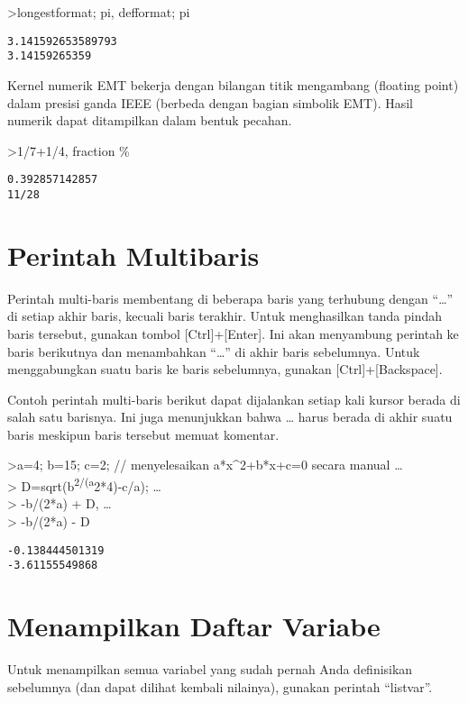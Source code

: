 \documentclass[
]{book}
\begin{document}
\textgreater longestformat; pi, defformat; pi

\begin{verbatim}
3.141592653589793
3.14159265359
\end{verbatim}

Kernel numerik EMT bekerja dengan bilangan titik mengambang (floating point) dalam presisi ganda IEEE (berbeda dengan bagian simbolik EMT). Hasil numerik dapat ditampilkan dalam bentuk pecahan.

\textgreater1/7+1/4, fraction \%

\begin{verbatim}
0.392857142857
11/28
\end{verbatim}

\chapter{Perintah Multibaris}\label{perintah-multibaris}

Perintah multi-baris membentang di beberapa baris yang terhubung dengan ``\ldots{}'' di setiap akhir baris, kecuali baris terakhir. Untuk menghasilkan tanda pindah baris tersebut, gunakan tombol {[}Ctrl{]}+{[}Enter{]}. Ini akan menyambung perintah ke baris berikutnya dan menambahkan ``\ldots{}'' di akhir baris sebelumnya. Untuk menggabungkan suatu baris ke baris sebelumnya, gunakan {[}Ctrl{]}+{[}Backspace{]}.

Contoh perintah multi-baris berikut dapat dijalankan setiap kali kursor berada di salah satu barisnya. Ini juga menunjukkan bahwa \ldots{} harus berada di akhir suatu baris meskipun baris tersebut memuat komentar.

\textgreater a=4; b=15; c=2; // menyelesaikan a*x\^{}2+b*x+c=0 secara manual \ldots{}\\
\textgreater{} D=sqrt(b\textsuperscript{2/(a}2*4)-c/a); \ldots{}\\
\textgreater{} -b/(2*a) + D, \ldots{}\\
\textgreater{} -b/(2*a) - D

\begin{verbatim}
-0.138444501319
-3.61155549868
\end{verbatim}

\chapter{Menampilkan Daftar Variabe}\label{menampilkan-daftar-variabe}

Untuk menampilkan semua variabel yang sudah pernah Anda definisikan sebelumnya (dan dapat dilihat kembali nilainya), gunakan perintah ``listvar''.
\end{document}

